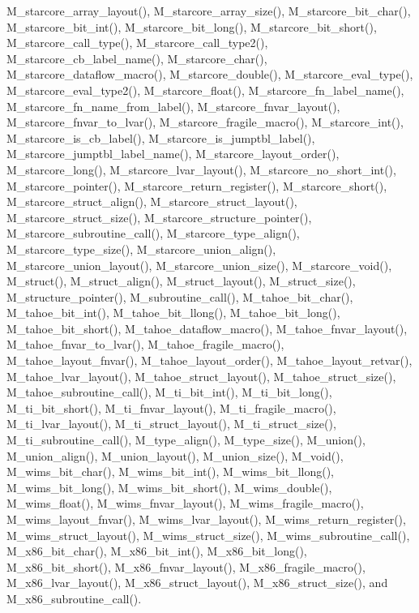 M\_\-starcore\_\-array\_\-layout(), M\_\-starcore\_\-array\_\-size(), M\_\-starcore\_\-bit\_\-char(), M\_\-starcore\_\-bit\_\-int(), M\_\-starcore\_\-bit\_\-long(), M\_\-starcore\_\-bit\_\-short(), M\_\-starcore\_\-call\_\-type(), M\_\-starcore\_\-call\_\-type2(), M\_\-starcore\_\-cb\_\-label\_\-name(), M\_\-starcore\_\-char(), M\_\-starcore\_\-dataflow\_\-macro(), M\_\-starcore\_\-double(), M\_\-starcore\_\-eval\_\-type(), M\_\-starcore\_\-eval\_\-type2(), M\_\-starcore\_\-float(), M\_\-starcore\_\-fn\_\-label\_\-name(), M\_\-starcore\_\-fn\_\-name\_\-from\_\-label(), M\_\-starcore\_\-fnvar\_\-layout(), M\_\-starcore\_\-fnvar\_\-to\_\-lvar(), M\_\-starcore\_\-fragile\_\-macro(), M\_\-starcore\_\-int(), M\_\-starcore\_\-is\_\-cb\_\-label(), M\_\-starcore\_\-is\_\-jumptbl\_\-label(), M\_\-starcore\_\-jumptbl\_\-label\_\-name(), M\_\-starcore\_\-layout\_\-order(), M\_\-starcore\_\-long(), M\_\-starcore\_\-lvar\_\-layout(), M\_\-starcore\_\-no\_\-short\_\-int(), M\_\-starcore\_\-pointer(), M\_\-starcore\_\-return\_\-register(), M\_\-starcore\_\-short(), M\_\-starcore\_\-struct\_\-align(), M\_\-starcore\_\-struct\_\-layout(), M\_\-starcore\_\-struct\_\-size(), M\_\-starcore\_\-structure\_\-pointer(), M\_\-starcore\_\-subroutine\_\-call(), M\_\-starcore\_\-type\_\-align(), M\_\-starcore\_\-type\_\-size(), M\_\-starcore\_\-union\_\-align(), M\_\-starcore\_\-union\_\-layout(), M\_\-starcore\_\-union\_\-size(), M\_\-starcore\_\-void(), M\_\-struct(), M\_\-struct\_\-align(), M\_\-struct\_\-layout(), M\_\-struct\_\-size(), M\_\-structure\_\-pointer(), M\_\-subroutine\_\-call(), M\_\-tahoe\_\-bit\_\-char(), M\_\-tahoe\_\-bit\_\-int(), M\_\-tahoe\_\-bit\_\-llong(), M\_\-tahoe\_\-bit\_\-long(), M\_\-tahoe\_\-bit\_\-short(), M\_\-tahoe\_\-dataflow\_\-macro(), M\_\-tahoe\_\-fnvar\_\-layout(), M\_\-tahoe\_\-fnvar\_\-to\_\-lvar(), M\_\-tahoe\_\-fragile\_\-macro(), M\_\-tahoe\_\-layout\_\-fnvar(), M\_\-tahoe\_\-layout\_\-order(), M\_\-tahoe\_\-layout\_\-retvar(), M\_\-tahoe\_\-lvar\_\-layout(), M\_\-tahoe\_\-struct\_\-layout(), M\_\-tahoe\_\-struct\_\-size(), M\_\-tahoe\_\-subroutine\_\-call(), M\_\-ti\_\-bit\_\-int(), M\_\-ti\_\-bit\_\-long(), M\_\-ti\_\-bit\_\-short(), M\_\-ti\_\-fnvar\_\-layout(), M\_\-ti\_\-fragile\_\-macro(), M\_\-ti\_\-lvar\_\-layout(), M\_\-ti\_\-struct\_\-layout(), M\_\-ti\_\-struct\_\-size(), M\_\-ti\_\-subroutine\_\-call(), M\_\-type\_\-align(), M\_\-type\_\-size(), M\_\-union(), M\_\-union\_\-align(), M\_\-union\_\-layout(), M\_\-union\_\-size(), M\_\-void(), M\_\-wims\_\-bit\_\-char(), M\_\-wims\_\-bit\_\-int(), M\_\-wims\_\-bit\_\-llong(), M\_\-wims\_\-bit\_\-long(), M\_\-wims\_\-bit\_\-short(), M\_\-wims\_\-double(), M\_\-wims\_\-float(), M\_\-wims\_\-fnvar\_\-layout(), M\_\-wims\_\-fragile\_\-macro(), M\_\-wims\_\-layout\_\-fnvar(), M\_\-wims\_\-lvar\_\-layout(), M\_\-wims\_\-return\_\-register(), M\_\-wims\_\-struct\_\-layout(), M\_\-wims\_\-struct\_\-size(), M\_\-wims\_\-subroutine\_\-call(), M\_\-x86\_\-bit\_\-char(), M\_\-x86\_\-bit\_\-int(), M\_\-x86\_\-bit\_\-long(), M\_\-x86\_\-bit\_\-short(), M\_\-x86\_\-fnvar\_\-layout(), M\_\-x86\_\-fragile\_\-macro(), M\_\-x86\_\-lvar\_\-layout(), M\_\-x86\_\-struct\_\-layout(), M\_\-x86\_\-struct\_\-size(), and M\_\-x86\_\-subroutine\_\-call().
